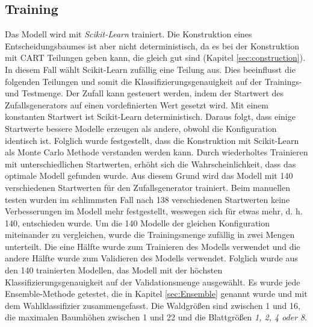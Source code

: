 \subsection{Training}
\label{sec:Training}
Das Modell wird mit \textit{Scikit-Learn} trainiert. Die Konstruktion eines Entscheidungsbaumes ist aber nicht deterministisch, da es bei der Konstruktion mit CART Teilungen geben kann, die gleich gut sind
(Kapitel \ref{sec:construction}). In diesem Fall wählt Scikit-Learn zufällig eine Teilung aus. Dies beeinflusst die folgenden Teilungen und somit die Klassifizierungsgenauigkeit auf der
Trainings- und Testmenge. Der Zufall kann gesteuert werden, indem der Startwert des Zufallsgenerators auf einen vordefinierten Wert gesetzt wird. Mit einem konstanten Startwert ist Scikit-Learn deterministisch.
\newline
\newline
Daraus folgt, dass einige Startwerte bessere Modelle erzeugen als andere, obwohl die Konfiguration identisch ist. Folglich wurde festgestellt, dass die Konstruktion mit Scikit-Learn als Monte Carlo Methode verstanden
werden kann. Durch wiederholtes Trainieren mit unterschiedlichen Startwerten, erhöht sich die Wahrscheinlichkeit, dass das optimale Modell gefunden wurde. Aus diesem Grund wird das
Modell mit 140 verschiedenen Startwerten für den Zufallsgenerator trainiert. Beim manuellen testen wurden im schlimmsten Fall nach 138 verschiedenen Startwerten keine Verbesserungen im Modell mehr festgestellt,
weswegen sich für etwas mehr, d. h. 140, entschieden wurde.
\newline
\newline
Um die 140 Modelle der gleichen Konfiguration miteinander zu vergleichen, wurde die Trainingsmenge zufällig in zwei Mengen unterteilt. Die eine Hälfte wurde zum Trainieren des Modells verwendet und die andere
Hälfte wurde zum Validieren des Modells verwendet. Folglich wurde aus den 140 trainierten Modellen, das Modell mit der höchsten Klassifizierungsgenauigkeit auf der Validationsmenge ausgewählt.
\newline
\newline
Es wurde jede Ensemble-Methode getestet, die in Kapitel \ref{sec:Ensemble} genannt wurde und mit dem Wahlklassifizier zusammengefasst. Die Waldgrößen sind zwischen 1 und 16, die maximalen Baumhöhen zwischen
1 und 22 und die Blattgrößen \textit{1, 2, 4 oder 8}.

